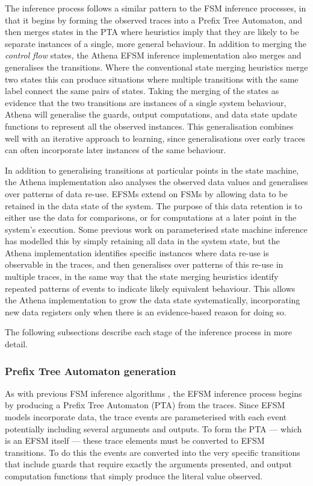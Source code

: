 The inference process follows a similar pattern to the FSM inference processes, in that it begins by forming the observed traces into a Prefix Tree Automaton, and then merges states in the PTA where heuristics imply that they are likely to be separate instances of a single, more general behaviour. In addition to merging the \emph{control flow} states, the Athena EFSM inference implementation also merges and generalises the transitions. Where the conventional state merging heuristics merge two states this can produce situations where multiple transitions with the same label connect the same pairs of states. Taking the merging of the states as evidence that the two transitions are instances of a single system behaviour, Athena will generalise the guards, output computations, and data state update functions to represent all the observed instances. This generalisation combines well with an iterative approach to learning, since generalisations over early traces can often incorporate later instances of the same behaviour.

In addition to generalising transitions at particular points in the state machine, the Athena implementation also analyses the observed data values and generalises over patterns of data re-use. EFSMs extend on FSMs by allowing data to be retained in the data state of the system. The purpose of this data retention is to either use the data for comparisons, or for computations at a later point in the system's execution. Some previous work on parameterised state machine inference has modelled this by simply retaining all data in the system state, but the Athena implementation identifies specific instances where data re-use is observable in the traces, and then generalises over patterns of this re-use in multiple traces, in the same way that the state merging heuristics identify repeated patterns of events to indicate likely equivalent behaviour. This allows the Athena implementation to grow the data state systematically, incorporating new data registers only when there is an evidence-based reason for doing so.

The following subsections describe each stage of the inference process in more detail.

\subsubsection{Prefix Tree Automaton generation}
\label{PTA}

As with previous FSM inference algorithms \cite{}, the EFSM inference process begins by producing a Prefix Tree Automaton (PTA) from the traces. Since EFSM models incorporate data, the trace events are parameterised with each event potentially including several arguments and outputs. To form the PTA --- which is an EFSM itself --- these trace elements must be converted to EFSM transitions. To do this the events are converted into the very specific transitions that include guards that require exactly the arguments presented, and output computation functions that simply produce the literal value observed.

